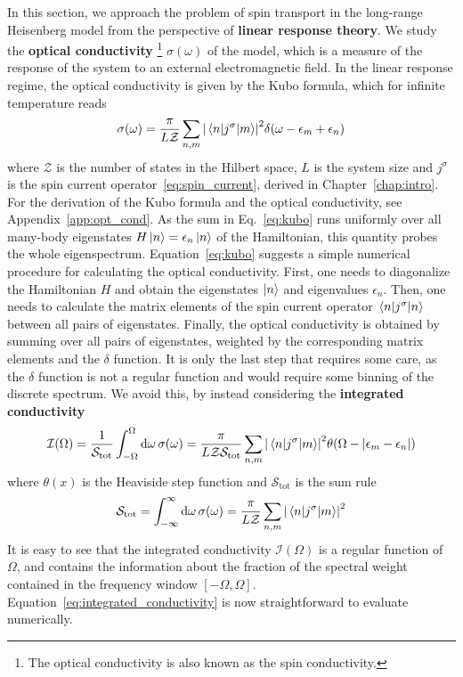 In this section, we approach the problem of spin transport in the long-range Heisenberg model from the
perspective of \textbf{linear response theory}. We study the \textbf{optical conductivity}
\footnote{The optical conductivity is also known as the spin conductivity.} \(\sigma(\omega)\) of the model,
which is a measure of the response of the system to an external electromagnetic field. 
In the linear response regime, the optical conductivity is given by the Kubo formula, which
for infinite temperature reads
\begin{equation}
  \sigma(\omega) = \frac{\pi}{L \mathcal{Z}} \sum_{n,m} \abs{\mel{n}{j^{\sigma}}{m}}^2 \delta(\omega - \epsilon_m + \epsilon_n)
  \label{eq:kubo}
\end{equation}
where \(\mathcal{Z}\) is the number of states in the Hilbert space, \(L\) is the system size and \(j^{\sigma}\) is the spin
current operator~\eqref{eq:spin_current}, derived in Chapter~\ref{chap:intro}.
For the derivation of the Kubo formula and the optical conductivity, see Appendix~\ref{app:opt_cond}.
As the sum in Eq.~\eqref{eq:kubo} runs 
uniformly over all many-body eigenstates \(H \ket{n} = \epsilon_n \ket{n}\) of the Hamiltonian, this quantity
probes the whole eigenspectrum. Equation~\ref {eq:kubo} suggests a simple numerical procedure for calculating
the optical conductivity. First, one needs to diagonalize the Hamiltonian \(H\) and obtain the eigenstates
\(\ket{n}\) and eigenvalues \(\epsilon_n\). Then, one needs to calculate the matrix elements of the spin current operator
\(\mel{n}{j^{\sigma}}{n}\) between all pairs of eigenstates. Finally, the optical conductivity is obtained by
summing over all pairs of eigenstates, weighted by the corresponding matrix elements and the \(\delta\) function.
It is only the last step that requires some care, as the \(\delta\) function is not a regular function and
would require some binning of the discrete spectrum. We avoid this, by instead considering the
\textbf{integrated conductivity}
\begin{equation}
  \mathcal{I}(\Omega) = \frac{1}{\mathcal{S}_{\mathrm{tot}}} \int_{-\Omega}^{\Omega} \dd{\omega} \sigma(\omega) = 
  \frac{\pi}{L \mathcal{Z} \mathcal{S}_{\mathrm{tot}}} \sum_{n,m} \abs{\mel{n}{j^{\sigma}}{m}}^2 \theta(\Omega- \abs{\epsilon_m - \epsilon_n})
  \label{eq:integrated_conductivity}
\end{equation}
where \(\theta(x)\) is the Heaviside step function and  \(\mathcal{S}_{\mathrm{tot}}\) is the sum rule
\begin{equation}
  \mathcal{S}_{\mathrm{tot}} = \int_{-\infty}^{\infty} \dd{\omega} \sigma(\omega) = \frac{\pi}{L \mathcal{Z}} \sum_{n,m} \abs{\mel{n}{j^{\sigma}}{m}}^2
\end{equation}
It is easy to see that the integrated conductivity \(\mathcal{I}(\Omega)\) is a regular function of \(\Omega\), and
contains the information about the fraction of the spectral weight contained in the frequency window 
\(\left[-\Omega,\Omega\right]\).
Equation~\eqref{eq:integrated_conductivity} is now straightforward to evaluate numerically.


